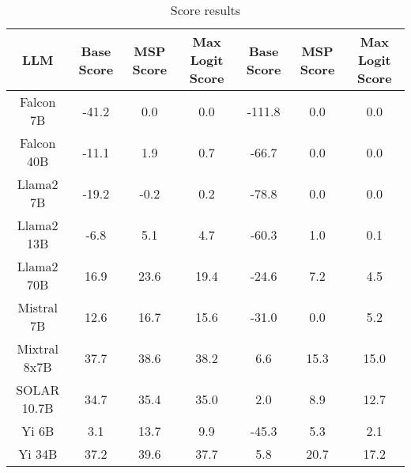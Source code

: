 \renewcommand\arraystretch{1.2}
\begin{table*}
\centering
\begin{tabular}{c|c|c|c|c|c|c}
LLM & Base Score & MSP Score & Max Logit Score & Base Score & MSP Score & Max Logit Score\\ \hline
Falcon 7B & -41.2 & 0.0 & 0.0 & -111.8 & 0.0 & 0.0\\
Falcon 40B & -11.1 & 1.9 & 0.7 & -66.7 & 0.0 & 0.0\\
Llama2 7B & -19.2 & -0.2 & 0.2 & -78.8 & 0.0 & 0.0\\
Llama2 13B & -6.8 & 5.1 & 4.7 & -60.3 & 1.0 & 0.1\\
Llama2 70B & 16.9 & 23.6 & 19.4 & -24.6 & 7.2 & 4.5\\
Mistral 7B & 12.6 & 16.7 & 15.6 & -31.0 & 0.0 & 5.2\\
Mixtral 8x7B & 37.7 & 38.6 & 38.2 & 6.6 & 15.3 & 15.0\\
SOLAR 10.7B & 34.7 & 35.4 & 35.0 & 2.0 & 8.9 & 12.7\\
Yi 6B & 3.1 & 13.7 & 9.9 & -45.3 & 5.3 & 2.1\\
Yi 34B & 37.2 & 39.6 & 37.7 & 5.8 & 20.7 & 17.2\\
\hline
\end{tabular}
\caption{Score results}
\end{table*}
\label{tab:score}
